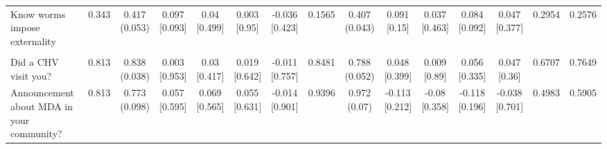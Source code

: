 \documentclass[
]{article}
\begin{document}
\begin{table}
{\begin{tabular}[t]{lcccccccccccccc}
\hspace{1em}Know worms impose externality & 0.343 & \makecell[c]{0.417\\(0.053)} & \makecell[c]{0.097\\{[0.093]}} & \makecell[c]{0.04\\{[0.499]}} & \makecell[c]{0.003\\{[0.95]}} & \makecell[c]{-0.036\\{[0.423]}} & 0.1565 & \makecell[c]{0.407\\(0.043)} & \makecell[c]{0.091\\{[0.15]}} & \makecell[c]{0.037\\{[0.463]}} & \makecell[c]{0.084\\{[0.092]}} & \makecell[c]{0.047\\{[0.377]}} & 0.2954 & 0.2576\\
\addlinespace[0.3em]
\hline
\multicolumn{15}{l}{\textit{\textbf{Panel D: Implementation, $N=2,407$}}}\\
\hline
\hspace{1em}Did a CHV visit you? & 0.813 & \makecell[c]{0.838\\(0.038)} & \makecell[c]{0.003\\{[0.953]}} & \makecell[c]{0.03\\{[0.417]}} & \makecell[c]{0.019\\{[0.642]}} & \makecell[c]{-0.011\\{[0.757]}} & 0.8481 & \makecell[c]{0.788\\(0.052)} & \makecell[c]{0.048\\{[0.399]}} & \makecell[c]{0.009\\{[0.89]}} & \makecell[c]{0.056\\{[0.335]}} & \makecell[c]{0.047\\{[0.36]}} & 0.6707 & 0.7649\\
\hspace{1em}Announcement about MDA in your community? & 0.813 & \makecell[c]{0.773\\(0.098)} & \makecell[c]{0.057\\{[0.595]}} & \makecell[c]{0.069\\{[0.565]}} & \makecell[c]{0.055\\{[0.631]}} & \makecell[c]{-0.014\\{[0.901]}} & 0.9396 & \makecell[c]{0.972\\(0.07)} & \makecell[c]{-0.113\\{[0.212]}} & \makecell[c]{-0.08\\{[0.358]}} & \makecell[c]{-0.118\\{[0.196]}} & \makecell[c]{-0.038\\{[0.701]}} & 0.4983 & 0.5905\\

\end{tabular}}
\end{table}
\end{document}
